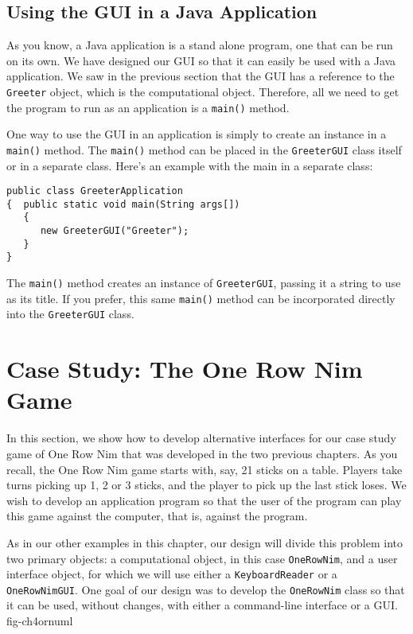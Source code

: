\subsection{Using the GUI in a Java Application}

As you know, a Java application is a stand alone program, one that can
be run on its own.  We have designed our GUI so that it can easily be
used with a Java application. We saw in the previous section that the
GUI has a reference to the {\tt Greeter} object, which is the
computational object. Therefore, all we need to get the program to run
as an application is a {\tt main()} method.

One way to use the GUI in an application is simply to create an instance
in a {\tt main()} method. The {\tt main()} method can be placed in the
{\tt GreeterGUI} class itself or in a separate class. Here's an example
with the main in a separate class:

\begin{jjjlisting}
\begin{lstlisting}
public class GreeterApplication 
{  public static void main(String args[]) 
   {  
      new GreeterGUI("Greeter");	
   }
}
\end{lstlisting}
\end{jjjlisting}

\noindent The {\tt main()} method creates an instance of 
{\tt GreeterGUI}, passing it a string to use as its title.  If you
prefer, this same {\tt main()} method can be incorporated directly
into the {\tt GreeterGUI} class.


\section{Case Study: The One Row Nim Game }
\label{case-study-the-one-row-nim-game}

In this section, we show how to develop alternative interfaces for our
case study game of One Row Nim that was developed in the two previous
chapters. As you recall, the One Row Nim game starts with, say, 21
sticks on a table. Players take turns picking up 1, 2 or 3 sticks,
and the player to pick up the last stick loses.  We wish to 
develop an application program so that the user of the program
can play this game against the computer, that is, against the program. 

As in our other examples in this chapter, our design will divide this
problem into two primary objects: a computational object, in this case
{\tt OneRowNim}, and a user interface object, for which we will
use either a {\tt KeyboardReader} or a {\tt OneRowNimGUI}. One goal of
our design was to develop the {\tt OneRowNim} class so that it can be
used, without changes, with either a command-line interface or a GUI.
{fig-ch4ornuml}

